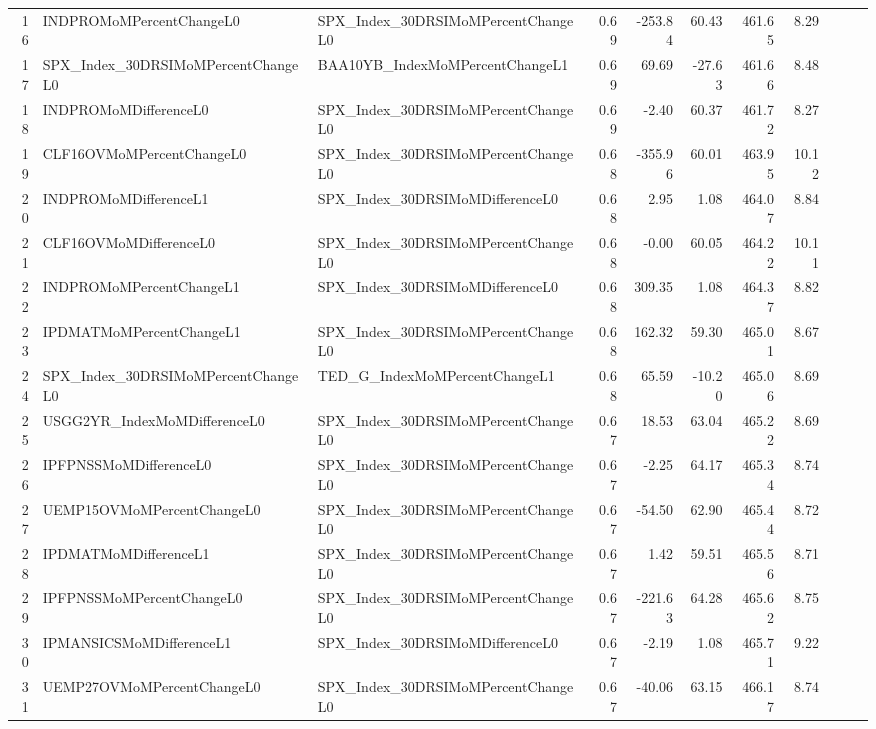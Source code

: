 \begin{longtable}{rllrrrrrlll}
  16 & INDPROMoMPercentChangeL0 & SPX\_Index\_30DRSIMoMPercentChangeL0 & 0.69 & -253.84 & 60.43 & 461.65 & 8.29 &  &  &  \\ 
  17 & SPX\_Index\_30DRSIMoMPercentChangeL0 & BAA10YB\_IndexMoMPercentChangeL1 & 0.69 & 69.69 & -27.63 & 461.66 & 8.48 &  &  &  \\ 
  18 & INDPROMoMDifferenceL0 & SPX\_Index\_30DRSIMoMPercentChangeL0 & 0.69 & -2.40 & 60.37 & 461.72 & 8.27 &  &  &  \\ 
  19 & CLF16OVMoMPercentChangeL0 & SPX\_Index\_30DRSIMoMPercentChangeL0 & 0.68 & -355.96 & 60.01 & 463.95 & 10.12 &  &  &  \\ 
  20 & INDPROMoMDifferenceL1 & SPX\_Index\_30DRSIMoMDifferenceL0 & 0.68 & 2.95 & 1.08 & 464.07 & 8.84 &  &  &  \\ 
  21 & CLF16OVMoMDifferenceL0 & SPX\_Index\_30DRSIMoMPercentChangeL0 & 0.68 & -0.00 & 60.05 & 464.22 & 10.11 &  &  &  \\ 
  22 & INDPROMoMPercentChangeL1 & SPX\_Index\_30DRSIMoMDifferenceL0 & 0.68 & 309.35 & 1.08 & 464.37 & 8.82 &  &  &  \\ 
  23 & IPDMATMoMPercentChangeL1 & SPX\_Index\_30DRSIMoMPercentChangeL0 & 0.68 & 162.32 & 59.30 & 465.01 & 8.67 &  &  &  \\ 
  24 & SPX\_Index\_30DRSIMoMPercentChangeL0 & TED\_G\_IndexMoMPercentChangeL1 & 0.68 & 65.59 & -10.20 & 465.06 & 8.69 &  &  &  \\ 
  25 & USGG2YR\_IndexMoMDifferenceL0 & SPX\_Index\_30DRSIMoMPercentChangeL0 & 0.67 & 18.53 & 63.04 & 465.22 & 8.69 &  &  &  \\ 
  26 & IPFPNSSMoMDifferenceL0 & SPX\_Index\_30DRSIMoMPercentChangeL0 & 0.67 & -2.25 & 64.17 & 465.34 & 8.74 &  &  &  \\ 
  27 & UEMP15OVMoMPercentChangeL0 & SPX\_Index\_30DRSIMoMPercentChangeL0 & 0.67 & -54.50 & 62.90 & 465.44 & 8.72 &  &  &  \\ 
  28 & IPDMATMoMDifferenceL1 & SPX\_Index\_30DRSIMoMPercentChangeL0 & 0.67 & 1.42 & 59.51 & 465.56 & 8.71 &  &  &  \\ 
  29 & IPFPNSSMoMPercentChangeL0 & SPX\_Index\_30DRSIMoMPercentChangeL0 & 0.67 & -221.63 & 64.28 & 465.62 & 8.75 &  &  &  \\ 
  30 & IPMANSICSMoMDifferenceL1 & SPX\_Index\_30DRSIMoMDifferenceL0 & 0.67 & -2.19 & 1.08 & 465.71 & 9.22 &  &  &  \\ 
  31 & UEMP27OVMoMPercentChangeL0 & SPX\_Index\_30DRSIMoMPercentChangeL0 & 0.67 & -40.06 & 63.15 & 466.17 & 8.74 &  &  &  \\ 

\end{longtable}
